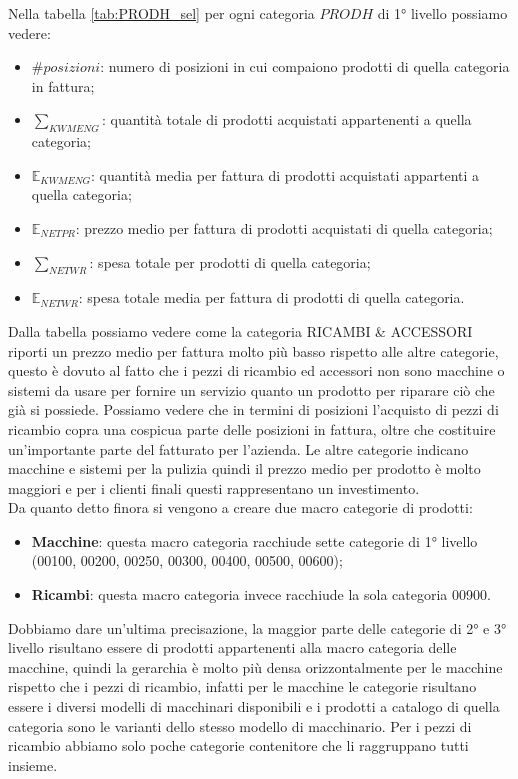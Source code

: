 Nella tabella \ref{tab:PRODH_sel} per ogni categoria $PRODH$ di 1° livello possiamo vedere:
\begin{itemize}
	\item $\#posizioni$: numero di posizioni in cui compaiono prodotti di quella categoria in fattura;
	\item $\sum_{KWMENG}$: quantità totale di prodotti acquistati appartenenti a quella categoria;
	\item $\mathbb{E}_{KWMENG}$: quantità media per fattura di prodotti acquistati appartenti a quella categoria;
	\item $\mathbb{E}_{NETPR}$: prezzo medio per fattura di prodotti acquistati di quella categoria;
	\item $\sum_{NETWR}$: spesa totale per prodotti di quella categoria;
	\item $\mathbb{E}_{NETWR}$: spesa totale media per fattura di prodotti di quella categoria.
\end{itemize}
Dalla tabella possiamo vedere come la categoria RICAMBI \& ACCESSORI riporti un prezzo medio per fattura molto più basso rispetto alle altre categorie, questo è dovuto al fatto che i pezzi di ricambio ed accessori non sono macchine o sistemi da usare per fornire un servizio quanto un prodotto per riparare ciò che già si possiede. Possiamo vedere che in termini di posizioni l'acquisto di pezzi di ricambio copra una cospicua parte delle posizioni in fattura, oltre che costituire un'importante parte del fatturato per l'azienda. Le altre categorie indicano macchine e sistemi per la pulizia quindi il prezzo medio per prodotto è molto maggiori e per i clienti finali questi rappresentano un investimento.\\
Da quanto detto finora si vengono a creare due macro categorie di prodotti:
\begin{itemize}
	\item \textbf{Macchine}: questa macro categoria racchiude sette categorie di 1° livello (00100, 00200, 00250, 00300, 00400, 00500, 00600);
	\item \textbf{Ricambi}: questa macro categoria invece racchiude la sola categoria 00900.
\end{itemize}

Dobbiamo dare un'ultima precisazione, la maggior parte delle categorie di 2° e 3° livello risultano essere di prodotti appartenenti alla macro categoria delle macchine, quindi la gerarchia è molto più densa orizzontalmente per le macchine rispetto che i pezzi di ricambio, infatti per le macchine le categorie risultano essere i diversi modelli di macchinari disponibili e i prodotti a catalogo di quella categoria sono le varianti dello stesso modello di macchinario. Per i pezzi di ricambio abbiamo solo poche categorie contenitore che li raggruppano tutti insieme.

